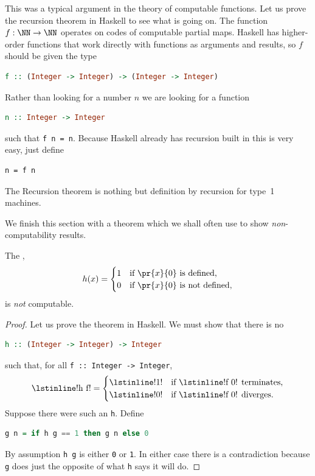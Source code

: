 This was a typical argument in the theory of computable functions. Let
us prove the recursion theorem in Haskell to see what is going on. The
function $f : \NN \to \NN$ operates on codes of computable partial
maps. Haskell has higher-order functions that work directly with functions as arguments and results, so $f$ should be given the type
%
\begin{lstlisting}[language=Haskell]
f :: (Integer -> Integer) -> (Integer -> Integer)
\end{lstlisting}
%
Rather than looking for a number $n$ we are looking for a function
%
\begin{lstlisting}[language=Haskell]
n :: Integer -> Integer
\end{lstlisting}
%
such that \lstinline!f n = n!. Because Haskell already has recursion built in this is very easy, just define
%
\begin{lstlisting}
n = f n
\end{lstlisting}
%
The Recursion theorem is nothing but definition by recursion for type~1 machines.

We finish this section with a theorem which we shall often use to show
\emph{non}-computability results.

\begin{theorem}
  The ,
  \begin{equation*}
    h(x) =
    \begin{cases}
      1 & \text{if $\pr{x}{0}$ is defined,}\\
      0 & \text{if $\pr{x}{0}$ is not defined,}
    \end{cases}
  \end{equation*}
  is \emph{not} computable.
\end{theorem}

\begin{proof}
  Let us prove the theorem in Haskell. We must show that there is no
\begin{lstlisting}[language=Haskell]
h :: (Integer -> Integer) -> Integer
\end{lstlisting}
  such that, for all \lstinline!f :: Integer -> Integer!,
  \begin{equation*}
    \text{\lstinline!h f!} =
    \begin{cases}
      \text{\lstinline!1!} & \text{if \lstinline!f 0! terminates,}\\
      \text{\lstinline!0!} & \text{if \lstinline!f 0! diverges.}
    \end{cases}
  \end{equation*}
  Suppose there were such an \lstinline!h!. Define
\begin{lstlisting}[language=Haskell]
g n = if h g == 1 then g n else 0
\end{lstlisting}
  By assumption \lstinline!h g! is either \lstinline!0! or
  \lstinline!1!. In either case there is a contradiction because
  \lstinline!g! does just the opposite of what \lstinline!h! says it
  will do.
\end{proof}

